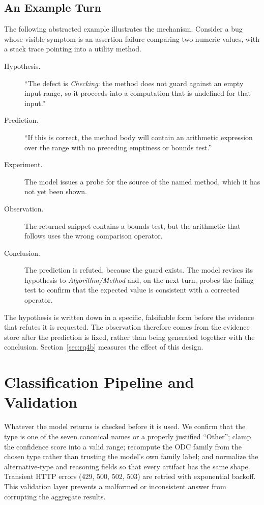 \documentclass{iutbscthesis}
\begin{document}
\subsection{An Example Turn}

The following abstracted example illustrates the mechanism. Consider a bug whose visible symptom is an assertion failure comparing two numeric values, with a stack trace pointing into a utility method.

\begin{description}
    \item[Hypothesis.] ``The defect is \emph{Checking}: the method does not guard against an empty input range, so it proceeds into a computation that is undefined for that input.''
    \item[Prediction.] ``If this is correct, the method body will contain an arithmetic expression over the range with no preceding emptiness or bounds test.''
    \item[Experiment.] The model issues a probe for the source of the named method, which it has not yet been shown.
    \item[Observation.] The returned snippet contains a bounds test, but the arithmetic that follows uses the wrong comparison operator.
    \item[Conclusion.] The prediction is refuted, because the guard exists. The model revises its hypothesis to \emph{Algorithm/Method} and, on the next turn, probes the failing test to confirm that the expected value is consistent with a corrected operator.
\end{description}

The hypothesis is written down in a specific, falsifiable form before the evidence that refutes it is requested. The observation therefore comes from the evidence store after the prediction is fixed, rather than being generated together with the conclusion. Section~\ref{sec:rq4b} measures the effect of this design.

\section{Classification Pipeline and Validation}

Whatever the model returns is checked before it is used. We confirm that the type is one of the seven canonical names or a properly justified ``Other''; clamp the confidence score into a valid range; recompute the ODC family from the chosen type rather than trusting the model's own family label; and normalize the alternative-type and reasoning fields so that every artifact has the same shape. Transient HTTP errors (429, 500, 502, 503) are retried with exponential backoff. This validation layer prevents a malformed or inconsistent answer from corrupting the aggregate results.
\end{document}
